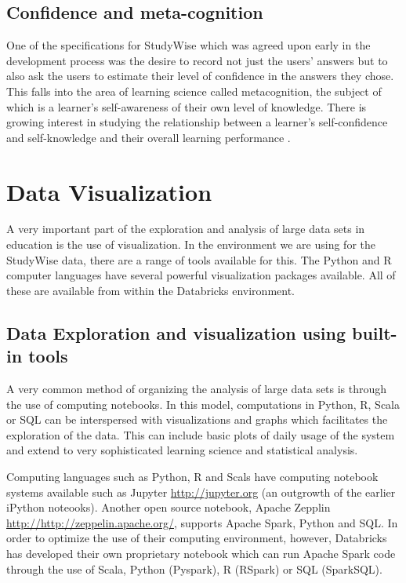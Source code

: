 \documentclass[runningheads,a4paper]{llncs}
\begin{document}
\subsection{Confidence and meta-cognition}
One of the specifications for StudyWise which was agreed upon early in the development process was the desire to record not just the users' answers but to also ask the users to estimate their level of confidence in the answers they chose.  This falls into the area of learning science called metacognition, the subject of which is a learner's self-awareness of their own level of knowledge.  There is growing interest in studying the relationship between a learner's self-confidence and self-knowledge and their overall learning performance \cite{Aghababyan2017}.

\section{Data Visualization}

A very important part of the exploration and analysis of large data sets in education is the use of visualization.  In the environment we are using for the StudyWise data, there are a range of tools available for this.  The Python and R computer languages have several powerful visualization packages available.  All of these are available from within the Databricks environment.

\subsection{Data Exploration and visualization using built-in tools}

A very common method of organizing the analysis of large data sets is through the use of computing notebooks.  In this model, computations in Python, R, Scala or SQL can be interspersed with visualizations and graphs which facilitates the exploration of the data.  This can include basic plots of daily usage of the system and extend to very sophisticated learning science and statistical analysis.

Computing languages such as Python, R and Scals have computing notebook systems available such as Jupyter \url{http://jupyter.org} (an outgrowth of the earlier iPython noteooks).  Another open source notebook, Apache Zepplin \url{http://http://zeppelin.apache.org/}, supports Apache Spark, Python and SQL.  In order to optimize the use of their computing environment, however, Databricks has developed their own proprietary notebook which can run Apache Spark code through the use of Scala, Python (Pyspark), R (RSpark) or SQL (SparkSQL).
\end{document}
